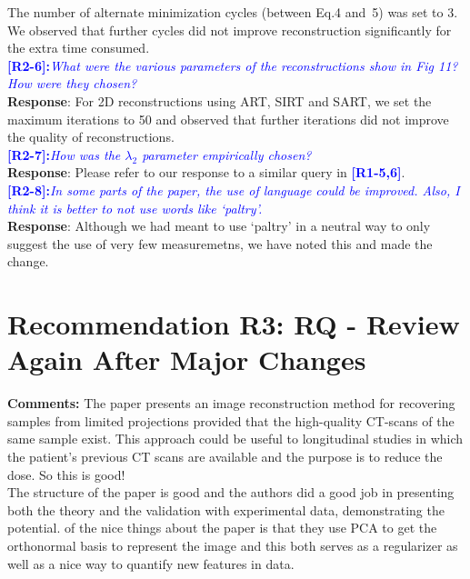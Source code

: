 \documentclass{article}
\begin{document}
The number of alternate minimization cycles (between Eq.4 and~5) was set to 3. We observed that further cycles did not improve reconstruction significantly for the extra time consumed.
\\

\textcolor{blue}{\textbf{[R2-6]:}\textit{What were the various parameters of the reconstructions show in Fig 11? How were they chosen?
}}\\

\textbf{Response}: For 2D reconstructions using ART, SIRT and SART, we set the maximum iterations to 50 and observed that further iterations did not improve the quality of reconstructions.\\

\textcolor{blue}{\textbf{[R2-7]:}\textit{How was the $\lambda_2$ parameter empirically chosen?
}}\\

\textbf{Response}: Please refer to our response to a similar query in \textcolor{blue}{\textbf{[R1-5,6]}}.\\

\textcolor{blue}{\textbf{[R2-8]:}\textit{In some parts of the paper, the use of language could be improved. Also, I think it is better to not use words like `paltry'.}}\\

\textbf{Response}: Although we had meant to use `paltry' in a neutral way to only suggest the use of very few measuremetns, we  have noted this and made the change.\\

\section{Recommendation R3: RQ - Review Again After Major Changes}

\textbf{Comments:} The paper presents an image reconstruction method for recovering samples from limited projections provided that the high-quality CT-scans of the same sample exist. This approach could be useful to longitudinal studies in which the patient's previous CT scans are available and the purpose is to reduce the dose. So this is good!\\

The structure of the paper is good and the authors did a good job in presenting both the theory and the validation with experimental data, demonstrating the potential. of the nice things about the paper is that they use PCA to get the orthonormal basis to represent the image and this both serves as a regularizer as well as a nice way to quantify new features in data.
\\
\end{document}
